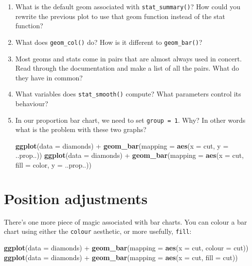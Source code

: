 \documentclass[]{book}
\newenvironment{Shaded}{\begin{snugshade}}{\end{snugshade}}
\newcommand{\KeywordTok}[1]{\textcolor[rgb]{0.13,0.29,0.53}{\textbf{{#1}}}}
\newcommand{\DataTypeTok}[1]{\textcolor[rgb]{0.13,0.29,0.53}{{#1}}}
\newcommand{\StringTok}[1]{\textcolor[rgb]{0.31,0.60,0.02}{{#1}}}
\newcommand{\NormalTok}[1]{{#1}}
\begin{document}
\begin{enumerate}
\def\labelenumi{\arabic{enumi}.}
\item
  What is the default geom associated with \texttt{stat\_summary()}? How
  could you rewrite the previous plot to use that geom function instead
  of the stat function?
\item
  What does \texttt{geom\_col()} do? How is it different to
  \texttt{geom\_bar()}?
\item
  Most geoms and stats come in pairs that are almost always used in
  concert. Read through the documentation and make a list of all the
  pairs. What do they have in common?
\item
  What variables does \texttt{stat\_smooth()} compute? What parameters
  control its behaviour?
\item
  In our proportion bar chart, we need to set \texttt{group\ =\ 1}. Why?
  In other words what is the problem with these two graphs?

\begin{Shaded}
\begin{Highlighting}[]
\KeywordTok{ggplot}\NormalTok{(}\DataTypeTok{data =} \NormalTok{diamonds) +}\StringTok{ }
\StringTok{  }\KeywordTok{geom_bar}\NormalTok{(}\DataTypeTok{mapping =} \KeywordTok{aes}\NormalTok{(}\DataTypeTok{x =} \NormalTok{cut, }\DataTypeTok{y =} \NormalTok{..prop..))}
\KeywordTok{ggplot}\NormalTok{(}\DataTypeTok{data =} \NormalTok{diamonds) +}\StringTok{ }
\StringTok{  }\KeywordTok{geom_bar}\NormalTok{(}\DataTypeTok{mapping =} \KeywordTok{aes}\NormalTok{(}\DataTypeTok{x =} \NormalTok{cut, }\DataTypeTok{fill =} \NormalTok{color, }\DataTypeTok{y =} \NormalTok{..prop..))}
\end{Highlighting}
\end{Shaded}
\end{enumerate}

\section{Position adjustments}\label{position-adjustments}

There's one more piece of magic associated with bar charts. You can
colour a bar chart using either the \texttt{colour} aesthetic, or more
usefully, \texttt{fill}:

\begin{Shaded}
\begin{Highlighting}[]
\KeywordTok{ggplot}\NormalTok{(}\DataTypeTok{data =} \NormalTok{diamonds) +}\StringTok{ }
\StringTok{  }\KeywordTok{geom_bar}\NormalTok{(}\DataTypeTok{mapping =} \KeywordTok{aes}\NormalTok{(}\DataTypeTok{x =} \NormalTok{cut, }\DataTypeTok{colour =} \NormalTok{cut))}
\KeywordTok{ggplot}\NormalTok{(}\DataTypeTok{data =} \NormalTok{diamonds) +}\StringTok{ }
\StringTok{  }\KeywordTok{geom_bar}\NormalTok{(}\DataTypeTok{mapping =} \KeywordTok{aes}\NormalTok{(}\DataTypeTok{x =} \NormalTok{cut, }\DataTypeTok{fill =} \NormalTok{cut))}
\end{Highlighting}
\end{Shaded}
\end{document}
